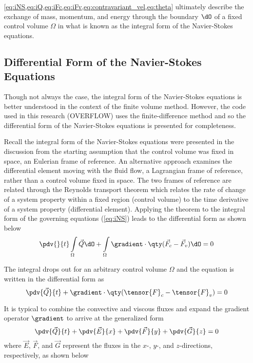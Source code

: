 \cref{eq:iNS,eq:iQ,eq:iFc,eq:iFv,eq:contravariant_vel,eq:theta} ultimately describe the exchange of mass, momentum, and energy through the boundary $\dO$ of a fixed control volume $\Omega$ in what is known as the integral form of the Navier-Stokes equations.

\subsection{Differential Form of the Navier-Stokes Equations}

Though not always the case, the integral form of the Navier-Stokes equations is better understood in the context of the finite volume method. However, the code used in this research (OVERFLOW) uses the finite-difference method and so the differential form of the Navier-Stokes equations is presented for completeness.

Recall the integral form of the Navier-Stokes equations were presented in the discussion from the starting assumption that the control volume was fixed in space, an Eulerian frame of reference. An alternative approach examines the differential element moving with the fluid flow, a Lagrangian frame of reference, rather than a control volume fixed in space. The two frames of reference are related through the Reynolds transport theorem which relates the rate of change of a system property within a fixed region (control volume) to the time derivative of a system property (differential element). Applying the theorem to the integral form of the governing equations (\cref{eq:iNS}) leads to the differential form as shown below
%
$$ \pdv{}{t}\int\limits_\Omega{\vec{Q}\dO} + \int\limits_\Omega{\gradient \cdot\qty(\vec{F}_c - \vec{F}_v)\dO} = 0 $$

The integral drops out for an arbitrary control volume $\Omega$ and the equation is written in the differential form as 
%
$$ \pdv{\vec{Q}}{t} + \gradient\cdot \qty(\tensor{F}_c - \tensor{F}_v) = 0 $$

It is typical to combine the convective and viscous fluxes and expand the gradient operator $\gradient$ to arrive at the generalized form
%
\begin{equation} 
\pdv{\vec{Q}}{t} + \pdv{\vec{E}}{x} + \pdv{\vec{F}}{y} + \pdv{\vec{G}}{z} = 0 
\label{eq:dNS}
\end{equation}
%
%
where $\vec{E}$, $\vec{F}$, and $\vec{G}$ represent the fluxes in the $x$-, $y$-, and $z$-directions, respectively, as shown below

